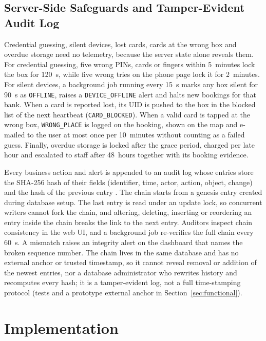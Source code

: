 \documentclass[journal,onecolumn]{IEEEtran}
\begin{document}
\subsection{Server-Side Safeguards and Tamper-Evident Audit Log}

Credential guessing, silent devices, lost cards, cards at the wrong box and overdue storage need no telemetry, because
the server state alone reveals them. For credential guessing, five wrong PINs, cards or fingers within 5~minutes lock
the box for 120~s, while five wrong tries on the phone page lock it for 2~minutes. For silent devices, a background job
running every 15~s marks any box silent for 90~s as \texttt{OFFLINE}, raises a \texttt{DEVICE\_OFFLINE} alert and halts
new bookings for that bank. When a card is reported lost, its UID is pushed to the box in the blocked list of the next
heartbeat (\texttt{CARD\_BLOCKED}). When a valid card is tapped at the wrong box, \texttt{WRONG\_PLACE} is logged on the
booking, shown on the map and e-mailed to the user at most once per 10~minutes without counting as a failed guess.
Finally, overdue storage is locked after the grace period, charged per late hour and escalated to staff after 48~hours
together with its booking evidence.

Every business action and alert is appended to an audit log whose entries store the SHA-256 hash of their fields
(identifier, time, actor, action, object, change) and the hash of the previous entry \cite{haber1991timestamp}. The
chain starts from a genesis entry created during database setup. The last entry is read under an update lock, so concurrent writers cannot fork the chain, and
altering, deleting, inserting or reordering an entry inside the chain breaks the link to the next entry. Auditors inspect
chain consistency in the web UI, and a background job re-verifies the full chain every 60~s. A mismatch raises an
integrity alert on the dashboard that names the broken sequence number. The chain lives in the same database and has
no external anchor or trusted timestamp, so it cannot reveal removal or addition of the newest entries, nor a database
administrator who rewrites history and recomputes every hash; it is a tamper-evident log, not a full time-stamping
protocol (tests and a prototype external anchor in Section~\ref{sec:functional}).

\section{Implementation}
\end{document}
